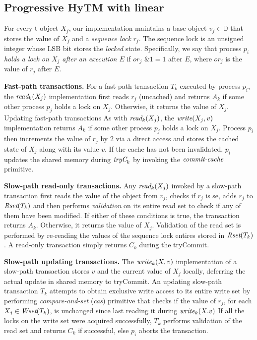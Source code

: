 \subsection{Progressive HyTM with linear}
\label{sec:hytm1}
%

%
For every t-object $X_j$, our implementation maintains a base object $v_j\in \mathbb{D}$ that stores the value of $X_j$
and a \emph{sequence lock} $r_{j}$. The sequence lock is an unsigned integer whose LSB bit stores the \emph{locked} state.
Specifically, we say that process $p_i$ \emph{holds a lock on $X_j$ after an execution $E$} if
$\textit{or}_j$ $\mathrel{\&} 1=1$ after $E$, where $\textit{or}_j$ is the value of $r_j$ after $E$.

\vspace{1mm}\noindent\textbf{Fast-path transactions.}
For a fast-path transaction $T_k$ executed by process $p_i$, the $\textit{read}_k(X_j)$ implementation first reads $r_j$ (uncached)
and returns $A_k$ if some other process $p_j$ holds a lock on $X_j$.
Otherwise, it returns the value of $X_j$.
Updating fast-path transactions 
As with $\textit{read}_k(X_j)$, the $\textit{write} (X_j,v)$ implementation returns $A_k$ if some other process $p_j$ holds a lock on $X_j$.
Process $p_i$ then increments the value of $r_j$ by $2$ via a direct access and stores the cached state of $X_j$ along with its value $v$.
If the cache has not been invalidated, $p_i$ updates the shared memory
during $\textit{tryC}_k$ by invoking the $\ms{commit-cache}$ primitive.

\vspace{1mm}\noindent\textbf{Slow-path read-only transactions.}
Any $\textit{read}_k(X_j)$ invoked by a slow-path transaction first reads the value of the object from $v_j$, 
checks if $r_j$ is se, adds $r_j$ to $\textit{Rset}(T_k)$
and then performs \emph{validation} on its entire read set to check if any of them have been modified. 
If either of these conditions is true,
the transaction returns $A_k$. Otherwise, it returns the value of $X_j$. 
Validation of the read set is performed by re-reading the values of the sequence lock entires stored in $\textit{Rset}(T_k)$.
A read-only transaction simply returns $C_k$ during the tryCommit.

\vspace{1mm}\noindent\textbf{Slow-path updating transactions.}
The $\textit{write}_k(X,v)$ implementation of a slow-path transaction stores
$v$ and the current value of $X_j$ locally, 
deferring the actual update in shared memory to tryCommit. 
An updating slow-path transaction $T_k$ attempts to obtain exclusive write access to its 
entire write set by performing \emph{compare-and-set} (\emph{cas})
primitive that checks if the value of $r_j$, for each $X_j\in \textit{Wset}(T_k)$, is unchanged since last reading it during $\textit{write}_k(X.v)$
If all the locks on the write set were acquired successfully, $T_k$ performs validation of the read set and returns $C_k$ if successful, else $p_i$ aborts the transaction.

